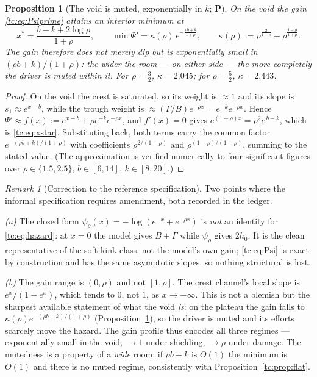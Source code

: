 \documentclass[11pt]{article}
\numberwithin{equation}{section}
\theoremstyle{plain}
\newtheorem{proposition}[theorem]{Proposition}
\theoremstyle{definition}
\theoremstyle{remark}
\newtheorem{remark}[theorem]{Remark}
\begin{document}
\begin{proposition}[The void is muted, exponentially in $k$;
\textbf{P}]\label{tc:prop:mingain}
On the void the gain \eqref{tc:eq:Psiprime} attains an interior minimum
at
\begin{equation}\label{tc:eq:xstar}
x^{*}=\frac{b-k+2\log\rho}{1+\rho},
\qquad
\min\Psi'=\kappa(\rho)\,e^{-\frac{\rho b+k}{1+\rho}},
\qquad
\kappa(\rho):=\rho^{\frac{2}{1+\rho}}+\rho^{\frac{1-\rho}{1+\rho}} .
\end{equation}
The gain therefore does not merely dip but is \emph{exponentially small
in $(\rho b+k)/(1+\rho)$}: the wider the room --- on either side --- the
more completely the driver is muted within it. For $\rho=\tfrac32$,
$\kappa=2.045$; for $\rho=\tfrac52$, $\kappa=2.443$.
\end{proposition}

\begin{proof}
On the void the crest is saturated, so its weight is $\approx1$ and its
slope is $s_{1}\approx e^{x-b}$, while the trough weight is
$\approx(\Gamma/B)e^{-\rho x}=e^{-k}e^{-\rho x}$. Hence
$\Psi'\approx f(x):=e^{x-b}+\rho e^{-k}e^{-\rho x}$, and $f'(x)=0$ gives
$e^{(1+\rho)x}=\rho^{2}e^{\,b-k}$, which is \eqref{tc:eq:xstar}.
Substituting back, both terms carry the common factor
$e^{-(\rho b+k)/(1+\rho)}$ with coefficients $\rho^{2/(1+\rho)}$ and
$\rho^{(1-\rho)/(1+\rho)}$, summing to the stated value. (The
approximation is verified numerically to four significant figures over
$\rho\in\{1.5,2.5\}$, $b\in[6,14]$, $k\in[8,20]$.)
\end{proof}

\begin{remark}[Correction to the reference specification]
\label{tc:rem:speccorr}
Two points where the informal specification requires amendment, both
recorded in the ledger.

\emph{(a)} The closed form $\psi_\rho(x)=-\log(e^{-x}+e^{-\rho x})$ is
\emph{not} an identity for \eqref{tc:eq:hazard}: at $x=0$ the model
gives $B+\Gamma$ while $\psi_\rho$ gives $2h_0$. It is the clean
representative of the soft-kink class, not the model's own gain;
\eqref{tc:eq:Psi} is exact by construction and has the same asymptotic
slopes, so nothing structural is lost.

\emph{(b)} The gain range is $(0,\rho)$ and not $[1,\rho]$. The crest
channel's local slope is $e^{x}/(1+e^{x})$, which tends to $0$, not $1$,
as $x\to-\infty$. This is not a blemish but the sharpest available
statement of what the void \emph{is}: on the plateau the gain falls to
$\kappa(\rho)e^{-(\rho b+k)/(1+\rho)}$
(Proposition~\ref{tc:prop:mingain}), so
the driver is muted and its efforts scarcely move the hazard. The gain
profile thus encodes all three regimes --- exponentially small in the
void, $\to1$ under shielding, $\to\rho$ under damage. The mutedness is a
property of a \emph{wide} room: if $\rho b+k$ is $O(1)$ the minimum is
$O(1)$ and there is no muted regime, consistently with
Proposition~\ref{tc:prop:flat}.
\end{remark}
\end{document}
